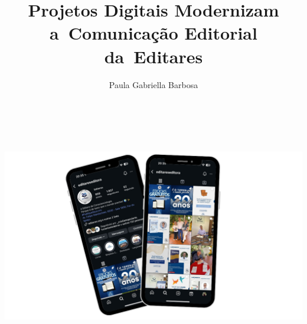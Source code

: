 \documentclass{gescons}
\author{Paula Gabriella Barbosa}
\title{Projetos Digitais Modernizam a~Comunicação Editorial da~Editares}
\begin{document}
    \makeentrevistatitle


    
    
\begin{center}
    \includegraphics[height=10cm]{articles/atualizacoes/fotos/materia5/Instagram-Editares.png} 
\end{center}
    
\end{document}

